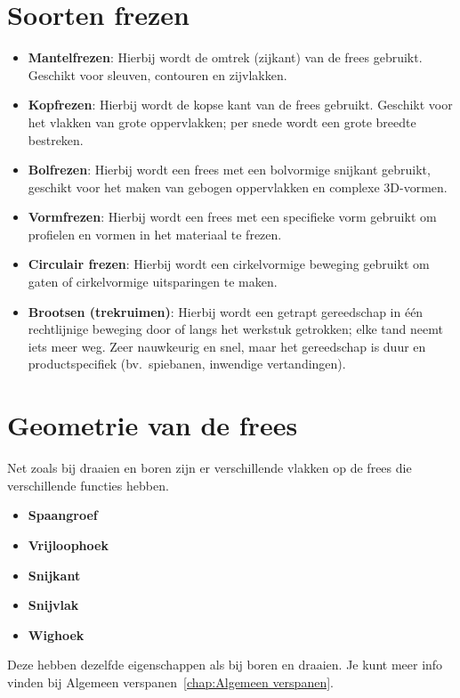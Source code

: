 \documentclass[a4paper,11pt,twoside]{report}
\begin{document}
\section{Soorten frezen}
\begin{itemize}
    \item \textbf{Mantelfrezen}: Hierbij wordt de omtrek (zijkant) van de frees gebruikt. Geschikt voor sleuven, contouren en zijvlakken.
    \item \textbf{Kopfrezen}: Hierbij wordt de kopse kant van de frees gebruikt. Geschikt voor het vlakken van grote oppervlakken; per snede wordt een grote breedte bestreken.
    \item \textbf{Bolfrezen}: Hierbij wordt een frees met een bolvormige snijkant gebruikt, geschikt voor het maken van gebogen oppervlakken en complexe 3D-vormen.
    \item \textbf{Vormfrezen}: Hierbij wordt een frees met een specifieke vorm gebruikt om profielen en vormen in het materiaal te frezen.
    \item \textbf{Circulair frezen}: Hierbij wordt een cirkelvormige beweging gebruikt om gaten of cirkelvormige uitsparingen te maken.
    \item \textbf{Brootsen (trekruimen)}: Hierbij wordt een getrapt gereedschap in één rechtlijnige beweging door of langs het werkstuk getrokken; elke tand neemt iets meer weg. Zeer nauwkeurig en snel, maar het gereedschap is duur en productspecifiek (bv.\ spiebanen, inwendige vertandingen).
\end{itemize}

\section{Geometrie van de frees}

Net zoals bij draaien en boren zijn er verschillende vlakken op de frees die verschillende functies hebben.
\begin{itemize}
    \item \textbf{Spaangroef}
    \item \textbf{Vrijloophoek}
    \item \textbf{Snijkant}
    \item \textbf{Snijvlak}
    \item \textbf{Wighoek}
\end{itemize}

Deze hebben dezelfde eigenschappen als bij boren en draaien.
Je kunt meer info vinden bij Algemeen verspanen~\ref{chap:Algemeen verspanen}.
\end{document}
